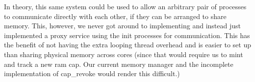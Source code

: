 In theory, this same system could be used to allow an arbitrary pair of 
processes to communicate directly with each other, if they can be arranged to 
share memory. This, however, we never got around to implementing and instead 
just implemented a proxy service using the init processes for communication. 
This has the benefit of not having the extra looping thread overhead and is 
easier to set up than sharing physical memory across cores (since that would 
require us to mint and track a new ram cap. Our current memory manager and the
incomplete implementation of cap\_revoke would render this difficult.)
